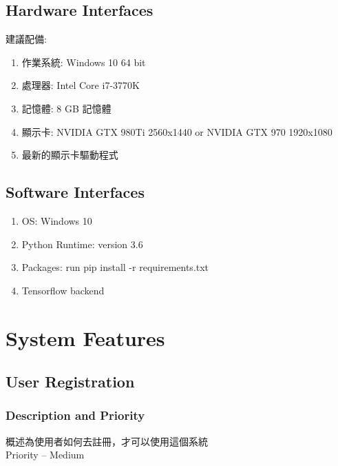 \documentclass{scrreprt}
\begin{document}
\begin{CJK*}{UTF8}{bsmi}
\section{Hardware Interfaces}
建議配備:
\begin{enumerate}
\item 作業系統: Windows 10 64 bit
\item 處理器: Intel Core i7-3770K
\item 記憶體: 8 GB 記憶體
\item 顯示卡: NVIDIA GTX 980Ti 2560x1440 or NVIDIA GTX 970 1920x1080
\item 最新的顯示卡驅動程式
\end{enumerate}

\section{Software Interfaces}
\begin{enumerate}
\item OS: Windows 10
\item Python Runtime: version 3.6
\item Packages: run pip install -r requirements.txt
\item Tensorflow backend
\end{enumerate}



\chapter{System Features}
\section{User Registration}
\subsection{Description and Priority}
概述為使用者如何去註冊，才可以使用這個系統\\
Priority – Medium


\end{CJK*}
\end{document}
